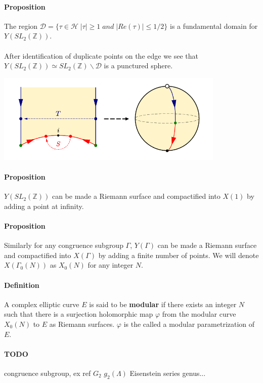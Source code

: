 \documentclass[letterpaper,10pt]{article}
\begin{document}
\paragraph{Proposition} The region $\mathcal{D} = \{ \tau \in \mathcal{H}\;  |\tau| \geq 1 \; and \; |Re(\tau)| \leq 1/2\}$ is a fundamental domain for $Y(SL_2(\mathbb{Z}))$.

{\itshape \paragraph{} After identification of duplicate points on the edge we see that $Y(SL_2(\mathbb{Z})) \simeq SL_2(\mathbb{Z})\backslash \mathcal{D}$ is a punctured sphere.
}

\includegraphics[scale=1.0]{sphere}

\paragraph{Proposition}  $Y(SL_2(\mathbb{Z}))$ can be made a Riemann surface and compactified into $X(1)$ by adding a point at infinity.



\paragraph{Proposition} Similarly for any congruence subgroup $\Gamma$, $Y(\Gamma)$ can be made a Riemann surface and compactified into $X(\Gamma)$
 by adding a finite number of points. We will denote $X(\Gamma_0(N))$ as $X_0(N)$ for any integer $N$. 

\paragraph{Definition} A complex elliptic curve $E$ is said to be \textbf{modular} if there exists an integer $N$ such that there is a surjection holomorphic map $\varphi$ 
from the modular curve $X_0(N)$ to $E$ as Riemann surfaces. $\varphi$ is the called a modular parametrization of $E$.

\paragraph{TODO} congruence subgroup, ex ref \cite{zhou} $G_2$ $g_2(\Lambda)$ Eisenstein series genus...


\printbibliography %
\end{document}

